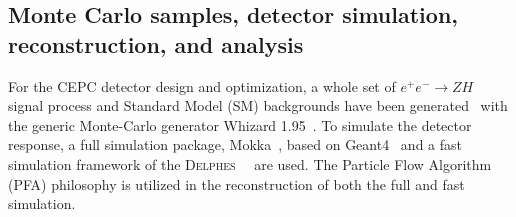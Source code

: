 \documentclass[a4paper,10pt,twoside]{cpc-hepnp}
\begin{document}
\begin{multicols}{2}


\section{Monte Carlo samples, detector simulation, reconstruction, and analysis\label{sec:simulation}}

For the CEPC detector design and optimization,
a whole set of $e^+e^- \to ZH$ signal process and Standard Model (SM) backgrounds have been generated~\cite{ref:cepccpc}
with the generic Monte-Carlo generator {\sf Whizard 1.95}{~\cite{ref:whizard}}.
To simulate the detector response, a full simulation package, Mokka{~\cite{ref:mokka}},
based on Geant4{~\cite{ref:geant4}} and a fast simulation framework of the {\textsc{Delphes}~}{~\cite{ref:delphes}} are used.  The Particle Flow Algorithm (PFA) philosophy is utilized in the reconstruction of both the full and fast simulation.


\end{multicols}
\end{document}

